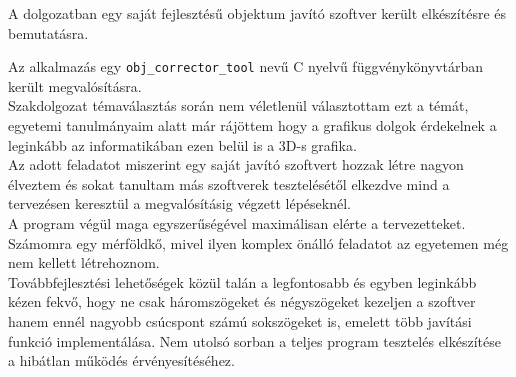 A dolgozatban egy saját fejlesztésű objektum javító szoftver került elkészítésre és bemutatásra.

Az alkalmazás egy \texttt{obj\_corrector\_tool} nevű C nyelvű függvénykönyvtárban került megvalósításra.\\

Szakdolgozat témaválasztás során nem véletlenül választottam ezt a témát, egyetemi tanulmányaim alatt már rájöttem hogy a grafikus dolgok érdekelnek a leginkább az informatikában ezen belül is a 3D-s grafika.\\

Az adott feladatot miszerint egy saját javító szoftvert hozzak létre nagyon élveztem és sokat tanultam más szoftverek tesztelésétől elkezdve mind a tervezésen keresztül a megvalósításig végzett lépéseknél.\\

A program végül maga egyszerűségével maximálisan elérte a tervezetteket. Számomra egy mérföldkő, mivel ilyen komplex önálló feladatot az egyetemen még nem kellett létrehoznom.\\

Továbbfejlesztési lehetőségek közül talán a legfontosabb és egyben leginkább kézen fekvő, hogy ne csak háromszögeket és négyszögeket kezeljen a szoftver hanem ennél nagyobb csúcspont számú sokszögeket is, emelett több javítási funkció implementálása. Nem utolsó sorban a teljes program tesztelés elkészítése a hibátlan működés érvényesítéséhez.